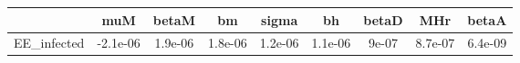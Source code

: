 \begin{tabular}{|c|c|c|c|c|c|c|c|c|}
\hline
& muM & betaM & bm & sigma & bh & betaD & MHr & betaA \\
\hline
EE_infected & -2.1e-06 & 1.9e-06 & 1.8e-06 & 1.2e-06 & 1.1e-06 & 9e-07 & 8.7e-07 & 6.4e-09 \\
\hline
\end{tabular}
